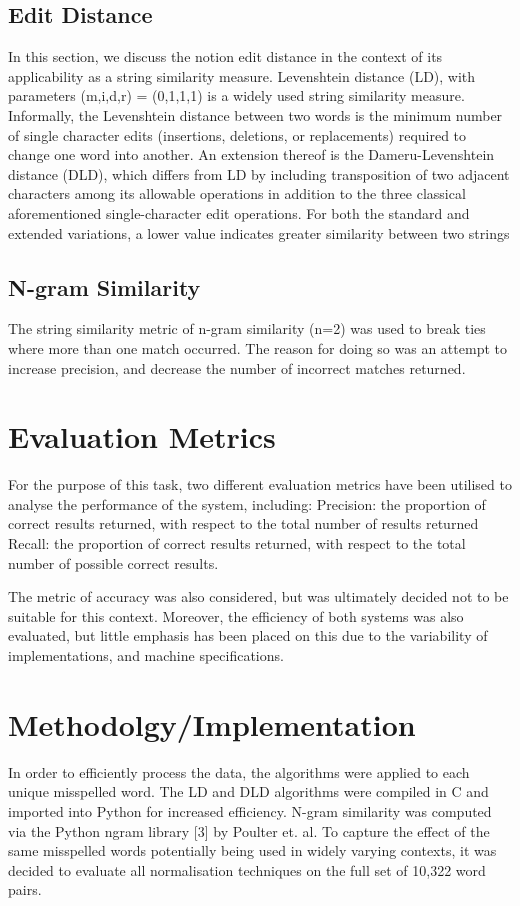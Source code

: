 \documentclass[11pt]{article}
\begin{document}
\subsection{Edit Distance}
In this section, we discuss the notion edit distance in the context of its applicability as a string similarity measure. Levenshtein distance (LD), with parameters (m,i,d,r) = (0,1,1,1) is a widely used string similarity measure. Informally, the Levenshtein distance between two words is the minimum number of single character edits (insertions, deletions, or replacements) required to change one word into another. An extension thereof is the Dameru-Levenshtein distance (DLD), which differs from LD by including transposition of two adjacent characters among its allowable operations in addition to the three classical aforementioned single-character edit operations. For both the standard and extended variations, a lower value indicates greater similarity between two strings

\subsection{N-gram Similarity}
The string similarity metric of n-gram similarity (n=2) was used to break ties where more than one match occurred. The reason for doing so was an attempt to increase precision, and decrease the number of incorrect matches returned.


\section{Evaluation Metrics}
For the purpose of this task, two different evaluation metrics have been utilised to analyse the performance of the system, including:
Precision: the proportion of correct results returned, with respect to the total number of results returned
Recall: the proportion of correct results returned, with respect to the total number of possible correct results.

The metric of accuracy was also considered, but was ultimately decided not to be suitable for this context.
Moreover, the efficiency of both systems was also evaluated, but little emphasis has been placed on this
due to the variability of implementations, and machine specifications.


\section{Methodolgy/Implementation}
In order to efficiently process the data, the algorithms were applied to each unique misspelled word.
The LD and DLD algorithms were compiled in C and imported into Python for increased efficiency. N-gram
similarity was computed via the Python ngram library [3] by Poulter et. al. To capture the effect of the same misspelled words potentially being used in widely varying contexts, it was decided to evaluate all normalisation techniques on the full set of 10,322 word pairs. 
\end{document}
